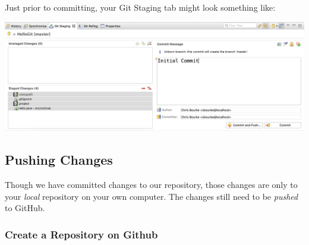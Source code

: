 \documentclass[12pt]{scrartcl}
\begin{document}
Just prior to committing, your Git Staging tab might look something like:

\begin{center}
\includegraphics[scale=0.35]{./hack1.0-files/eclipsePreCommit}
\end{center}

\subsection{Pushing Changes}

Though we have committed changes to our repository, those changes are only
to your \emph{local} repository on your own computer.  The changes  
still need to be \emph{pushed} to GitHub.

\subsubsection{Create a Repository on Github}
\end{document}
